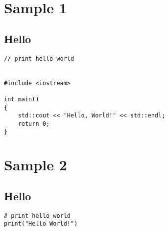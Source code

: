 \documentclass{article}
\begin{document}
\begin{multicols}{3}[]
\begin{tableofcontents}
\end{tableofcontents}

\section{Sample 1}

\subsection{Hello}

\begin{verbatim}
// print hello world


#include <iostream>

int main()
{
    std::cout << "Hello, World!" << std::endl;
    return 0;
}
\end{verbatim}


\section{Sample 2}

\subsection{Hello}

\begin{verbatim}
# print hello world
print("Hello World!")
\end{verbatim}


\end{multicols}
\end{document}
